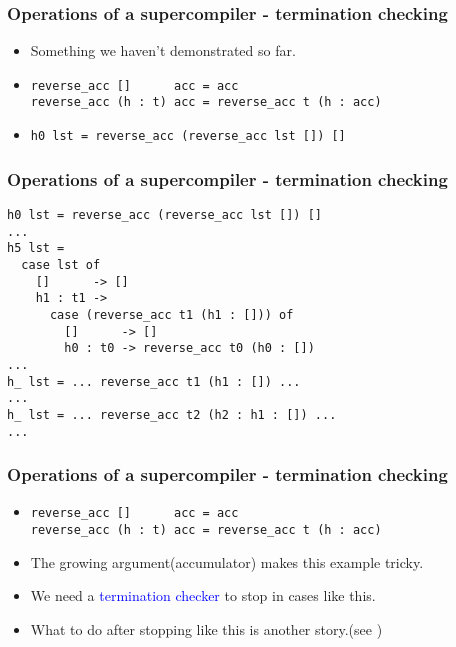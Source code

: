 \documentclass{beamer}
\begin{document}
\begin{frame}[fragile]

    \frametitle{Operations of a supercompiler - termination checking}

    \begin{itemize}[<+->]
        \item[]
            Something we haven't demonstrated so far.

        \item[]
            \begin{verbatim}
reverse_acc []      acc = acc
reverse_acc (h : t) acc = reverse_acc t (h : acc)
            \end{verbatim}

        \item[]
            \begin{verbatim}
h0 lst = reverse_acc (reverse_acc lst []) []
            \end{verbatim}
    \end{itemize}
\end{frame}

\begin{frame}[fragile]
    \frametitle{Operations of a supercompiler - termination checking}
    \begin{verbatim}
h0 lst = reverse_acc (reverse_acc lst []) []
...
h5 lst =
  case lst of
    []      -> []
    h1 : t1 ->
      case (reverse_acc t1 (h1 : [])) of
        []      -> []
        h0 : t0 -> reverse_acc t0 (h0 : [])
...
h_ lst = ... reverse_acc t1 (h1 : []) ...
...
h_ lst = ... reverse_acc t2 (h2 : h1 : []) ...
...
    \end{verbatim}
\end{frame}


\begin{frame}[fragile]
    \frametitle{Operations of a supercompiler - termination checking}
    \begin{itemize}[<+->]
        \item[]
            \begin{verbatim}
reverse_acc []      acc = acc
reverse_acc (h : t) acc = reverse_acc t (h : acc)
            \end{verbatim}

        \item[]
            The growing argument(accumulator) makes this example tricky.
        \item[]
            We need a \textcolor{blue}{termination checker} to stop in cases
            like this.
        \item[]
            What to do after stopping like this is another story.\newline (see
            \citet{callbyneed-sc})

    \end{itemize}

\end{frame}
\end{document}
